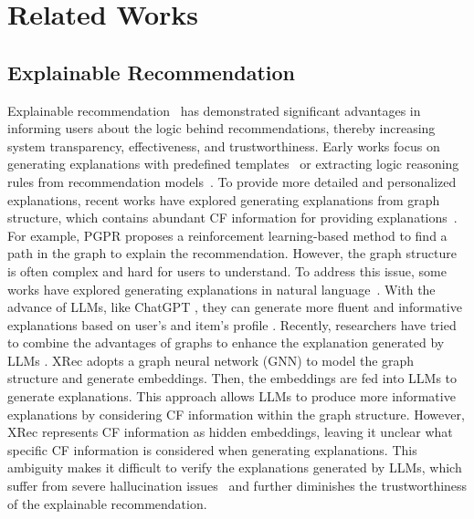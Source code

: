 \section{Related Works}

\subsection{Explainable Recommendation}
Explainable recommendation~\cite{zhang2020explainable,zhang2014explicit,peake2018explanation,chang2023knowledge,chang2024path,wang2024heterophilic} has demonstrated significant advantages in informing users about the logic behind recommendations, thereby increasing system transparency, effectiveness, and trustworthiness. 
Early works focus on generating explanations with predefined templates~\cite{li2021caesar} or extracting logic reasoning rules from recommendation models~\cite{shi2020neural,chen2021neural,zhu2021faithfully}. To provide more detailed and personalized explanations, recent works have explored generating explanations from graph structure, which contains abundant CF information for providing explanations~\cite{xian2019reinforcement,fu2020fairness,balloccu2023faithful}. For example, PGPR \cite{xian2019reinforcement} proposes a reinforcement learning-based method to find a path in the graph to explain the recommendation. However, the graph structure is often complex and hard for users to understand. To address this issue, some works have explored generating explanations in natural language~\cite{li2017neural,dong2017learning,chen2019co,li2021personalized,chen2021generate,li2023personalized,cheng2023explainable,ma2024xrec}. With the advance of LLMs, like ChatGPT \cite{chatgpt}, they can generate more fluent and informative explanations based on user's and item's profile \cite{li2023personalized}. 
Recently, researchers have tried to combine the advantages of graphs to enhance the explanation generated by LLMs \cite{qiu2024unveiling}. XRec \cite{ma2024xrec} adopts a graph neural network (GNN) to model the graph structure and generate embeddings. Then, the embeddings are fed into LLMs to generate explanations. This approach allows LLMs to produce more informative explanations by considering CF information within the graph structure. 
However, XRec represents CF information as hidden embeddings, leaving it unclear what specific CF information is considered when generating explanations. This ambiguity makes it difficult to verify the explanations generated by LLMs, which suffer from severe hallucination issues~\cite{zhang2023siren} and further diminishes the trustworthiness of the explainable recommendation.

